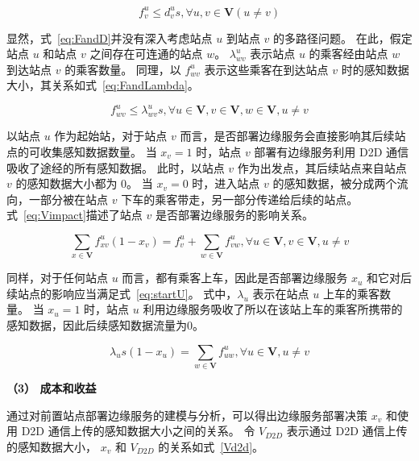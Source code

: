 \begin{equation}
\label{eq:FandD}
f^u_v \leq d^u_v s, \forall u, v\in \boldsymbol{V} (u \neq v)
\end{equation}

显然，式~\eqref{eq:FandD}并没有深入考虑站点 $u$ 到站点 $v$ 的多路径问题。
在此，假定站点 $u$ 和站点 $v$ 之间存在可连通的站点 $w$。
$\lambda^u_{wv}$ 表示站点 $u$ 的乘客经由站点 $w$ 到达站点 $v$ 的乘客数量。
同理，以 $f^u_{wv}$ 表示这些乘客在到达站点 $v$ 时的感知数据大小，其关系如式~\eqref{eq:FandLambda}。

\begin{equation}
\label{eq:FandLambda}
f^u_{wv} \leq \lambda^u_{wv} s, \forall u \in \boldsymbol{V}, v \in \boldsymbol{V}, w \in \boldsymbol{V}, u \neq v
\end{equation}

以站点 $u$ 作为起始站，对于站点 $v$ 而言，是否部署边缘服务会直接影响其后续站点的可收集感知数据数量。
当 $x_v =1$ 时，站点 $v$ 部署有边缘服务利用 D2D 通信吸收了途经的所有感知数据。
此时，以站点 $v$ 作为出发点，其后续站点来自站点 $v$ 的感知数据大小都为 0。
当 $x_v =0$ 时，进入站点 $v$ 的感知数据，被分成两个流向，一部分被在站点 $v$ 下车的乘客带走，另一部分传递给后续的站点。
式~\eqref{eq:Vimpact}描述了站点 $v$ 是否部署边缘服务的影响关系。

\begin{equation}
  \label{eq:Vimpact}
    \sum_{x\in \boldsymbol{V}}f^u_{xv} (1-x_v) = f^u_v + \sum_{w\in \boldsymbol{V}}f^u_{vw}, \forall u\in \boldsymbol{V}, v\in \boldsymbol{V}, u \neq v
\end{equation}

同样，对于任何站点 $u$ 而言，都有乘客上车，因此是否部署边缘服务 $x_u$ 和它对后续站点的影响应当满足式~\eqref{eq:startU}。
式中，$\lambda_u$ 表示在站点 $u$ 上车的乘客数量。
当 $x_u = 1$ 时，站点 $u$ 利用边缘服务吸收了所以在该站上车的乘客所携带的感知数据，因此后续感知数据流量为0。

\begin{equation}
\label{eq:startU}
\lambda_u s (1 - x_u) = \sum_{w\in \boldsymbol{V}}f^u_{uw}, \forall u\in \boldsymbol{V}, u \neq v
\end{equation}

\textbf{（3） 成本和收益}

通过对前置站点部署边缘服务的建模与分析，可以得出边缘服务部署决策 $x_v$ 和使用 D2D 通信上传的感知数据大小之间的关系。
令 $V_{D2D}$ 表示通过 D2D 通信上传的感知数据大小， $x_v$ 和 $V_{D2D}$ 的关系如式~\eqref{Vd2d}。

